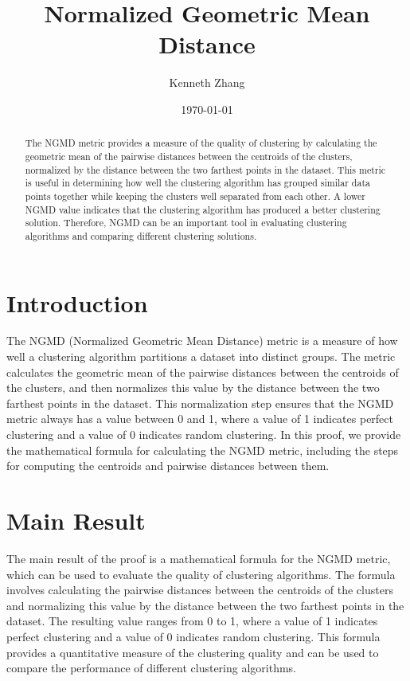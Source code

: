 \documentclass[12pt]{article}
\begin{document}
\title{Normalized Geometric Mean Distance}
\author{Kenneth Zhang}
\date{\today}
\maketitle

\begin{abstract}
    The NGMD metric provides a measure of the quality of clustering by calculating the geometric mean of the pairwise distances between the centroids of the clusters, normalized by the distance between the two farthest points in the dataset. This metric is useful in determining how well the clustering algorithm has grouped similar data points together while keeping the clusters well separated from each other. A lower NGMD value indicates that the clustering algorithm has produced a better clustering solution. Therefore, NGMD can be an important tool in evaluating clustering algorithms and comparing different clustering solutions.
\end{abstract}

\section{Introduction}

The NGMD (Normalized Geometric Mean Distance) metric is a measure of how well a clustering algorithm partitions a dataset into distinct groups. The metric calculates the geometric mean of the pairwise distances between the centroids of the clusters, and then normalizes this value by the distance between the two farthest points in the dataset. This normalization step ensures that the NGMD metric always has a value between 0 and 1, where a value of 1 indicates perfect clustering and a value of 0 indicates random clustering. In this proof, we provide the mathematical formula for calculating the NGMD metric, including the steps for computing the centroids and pairwise distances between them.

\section{Main Result}

The main result of the proof is a mathematical formula for the NGMD metric, which can be used to evaluate the quality of clustering algorithms. The formula involves calculating the pairwise distances between the centroids of the clusters and normalizing this value by the distance between the two farthest points in the dataset. The resulting value ranges from 0 to 1, where a value of 1 indicates perfect clustering and a value of 0 indicates random clustering. This formula provides a quantitative measure of the clustering quality and can be used to compare the performance of different clustering algorithms.
\end{document}
